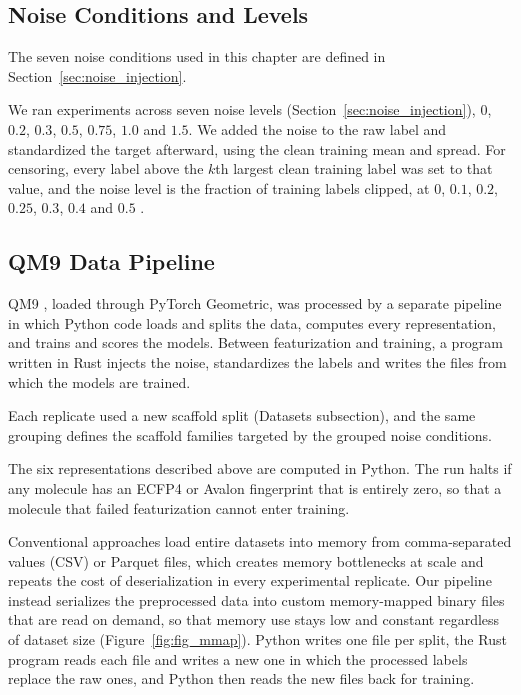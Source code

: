 \subsection{Noise Conditions and Levels}
The seven noise conditions used in this chapter are defined in Section~\ref{sec:noise_injection}.

We ran experiments across seven noise levels (Section~\ref{sec:noise_injection}), $0$, $0.2$, $0.3$, $0.5$, $0.75$, $1.0$ and $1.5$. We added the noise to the raw label and standardized the target afterward, using the clean training mean and spread. For censoring, every label above the $k$th largest clean training label was set to that value, and the noise level is the fraction of training labels clipped, at $0$, $0.1$, $0.2$, $0.25$, $0.3$, $0.4$ and $0.5$ \citep{Svensson2025}.


\subsection{QM9 Data Pipeline}

QM9 \citep{Ramakrishnan2014}, loaded through PyTorch Geometric, was processed by a separate pipeline
in which Python code loads and splits the data, computes every representation, and trains and scores
the models. Between featurization and training, a program written in Rust injects the noise,
standardizes the labels and writes the files from which the models are trained.

Each replicate used a new scaffold split (Datasets subsection), and the same grouping defines the scaffold families targeted by the grouped noise conditions.

The six representations described above are computed in Python. The run halts if any molecule has an ECFP4 or Avalon fingerprint
that is entirely zero, so that a molecule that failed featurization cannot enter training.

Conventional approaches load entire datasets into memory from comma-separated values (CSV) or Parquet files, which creates memory bottlenecks at scale and repeats the cost of deserialization in every experimental replicate. Our pipeline instead serializes the preprocessed data into custom memory-mapped binary files that are read on demand, so that memory use stays low and constant regardless of dataset size (Figure~\ref{fig:fig_mmap}). Python writes one file per split, the Rust program reads each file and writes a new one in which the processed labels replace the raw ones, and Python then reads the new files back for training.

